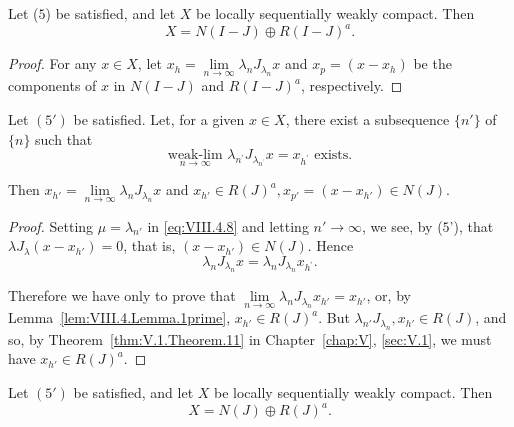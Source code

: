\begin{corollary}\label{cor:VIII.4.Corollary.1} Let ($5$) be satisfied, and let $X$ be locally sequentially weakly compact. Then 
\begin{equation}\label{eq:VIII.4.11}
X = N (I - J) \oplus R (I - J) ^{a}.
\end{equation}
\end{corollary}

\begin{proof}
 For any $x \in X$, let $x_{h} = \lim\limits_{n \to \infty} \lambda_{n} J_{\lambda_{n}} x$ and $x_{p} = (x - x_{h})$ be the components of $x$ in $N(I - J)$ and $R(I - J)^{a}$, respectively. 
\end{proof}

\begin{theoremn}\label{thm:VIII.4.Theorem.2prime} Let $(5')$ be satisfied. Let, for a given $x \in X$, there exist a subsequence $\{n'\}$ of $\{n\}$ such that 
\begin{equation}\tag{9'}\label{eq:VIII.4.9'}
\underset {n \rightarrow \infty} {\text{ weak-lim }} \lambda_ {n ^{\prime}} J _ {\lambda_ {n ^{\prime}}} x = x _ {h ^{\prime}} \text{ exists. }
\end{equation}

Then $x_{h'} = \lim\limits_{n\to \infty}\lambda_nJ_{\lambda_n}x$ and $x_{h'}\in R(J)^a, x_{p'} = (x - x_{h'})\in N(J).$
\end{theoremn}

\begin{proof}
 Setting $\mu = \lambda_{n'}$ in \eqref{eq:VIII.4.8} and letting $n' \to \infty$, we see, by ($5$'), that $\lambda J_{\lambda}(x - x_{h'}) = 0$, that is, $(x - x_{h'}) \in N(J)$. Hence 
\begin{equation}\tag{10'}\label{eq:VIII.4.10'}
\lambda_{n} J _ {\lambda_{n}} x = \lambda_{n} J _ {\lambda_{n}} x _ {h ^{\prime}}. \end{equation}

Therefore we have only to prove that $\lim\limits_{n\to \infty}\lambda_nJ_{\lambda_n}x_{h'} = x_{h'}$, or, by Lemma~\ref{lem:VIII.4.Lemma.1prime}, $x_{h'}\in R(J)^a$. But $\lambda_{n'}J_{\lambda_n},x_{h'}\in R(J)$, and so, by Theorem~\ref{thm:V.1.Theorem.11} in Chapter~\ref{chap:V}, \ref{sec:V.1}, we must have $x_{h'}\in R(J)^a$. 
\end{proof}

\begin{corollaryn}\label{cor:VIII.4.Corollary.1prime} Let $(5')$ be satisfied, and let $X$ be locally sequentially weakly compact. Then 
\begin{equation}\tag{11'}\label{eq:VIII.4.11'}
X = N (J) \oplus R (J) ^{a}.
\end{equation}
\end{corollaryn}

